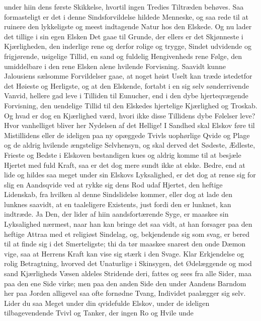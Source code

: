 \documentclass[12pt,a4paper]{book}
\newcommand{\apage}[1]{\marginnote{\footnotesize\textit{[#1]}}}
\begin{document}
under hiin dens første Skikkelse, hvortil ingen Tredies Tiltræden
behøves. Saa formasteligt er det i denne Sindsforvildelse hildede
Menneske, og saa rede til at ruinere den lykkeligste og meest
indtagende Natur hos den Elskede. Og nu lader det tillige i sin egen
Elsken Det gaae til Grunde, der ellers er det Skjønneste i Kjærligheden,
den inderlige rene og derfor rolige og trygge, Sindet udvidende og
frigjørende, usigelige Tillid, en sand og fuldelig Hengivenheds rene
Følge, den umiddelbare i den rene Elsken alene hvilende Forvisning.
Saavidt kunne Jalousiens sælsomme Forvildelser gaae, at noget høist
Uselt kan træde istedetfor det Høieste og Herligste, og at den Elskende,
fortabt i en sig selv sønderrivende Vanvid, hellere gad leve i Tilliden
til Eunucher, end i den dybe hjerteqvægende Forvisning, den uendelige
Tillid til den Elskedes hjertelige Kjærlighed og Troskab. Og hvad er dog
en Kjærlighed værd, hvori ikke disse Tillidens dybe Følelser leve? Hvor
vanhelliget bliver her Nydelsen af det Hellige! I Sandhed skal Elskov
føre til \apage{127} Mistillidens eller de ideligen paa ny opæggede Tvivls
uophørlige Qvide og Plage og de aldrig hvilende ængstelige Selvhensyn,
og skal derved det Sødeste, Ædleste, Frieste og Bedste i Elskoven
bestandigen kues og aldrig komme til at besjæle Hjertet med fuld Kraft,
saa er det dog mere sundt ikke at elske. Bedre, end at lide og hildes saa
meget under sin Elskovs Lyksalighed, er det dog at rense sig for slig en
Aandsqvide ved at rykke sig dens Rod udaf Hjertet, den heftige
Lidenskab, fra hvilken al denne Sindslidelse kommer, eller dog at lade
den lunknes saavidt, at en taaleligere Existents, just fordi den er
lunknet, kan indtræde. Ja Den, der lider af hiin aandsfortærende Syge,
er maaskee sin Lyksalighed nærmest, naar han kan bringe det saa vidt, at
han forsager paa den heftige Attraa med et religiøst Sindelag, og,
bekjendende sig som svag, er bered til at finde sig i det Smerteligste;
thi da tør maaskee snarest den onde Dæmon vige, saa at Herrens Kraft kan
vise sig stærk i den Svage. Klar Erkjendelse og rolig Betragtning,
hvorved det Unaturlige i Skinsygen, det Ødelæggende og mod sand
Kjærligheds Væsen aldeles Stridende deri, fattes og sees fra alle Sider,
maa paa den ene Side virke; men paa den anden Side den under Aandens
Barndom her paa Jorden alligevel saa ofte fornødne Tvang, Individet
paalægger sig selv. Lider du saa Meget under din qvidefulde Elskov, under
de ideligen tilbagevendende Tvivl og Tanker, der ingen Ro og Hvile unde
\end{document}
